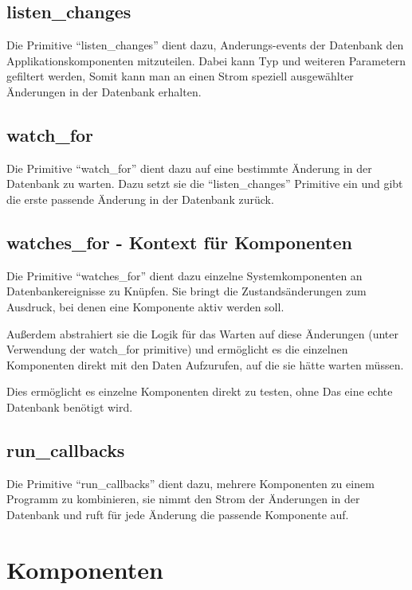 \subsection{listen\_changes}

Die Primitive ``listen\_changes'' dient dazu,
Anderungs-events der Datenbank den Applikationskomponenten mitzuteilen.
Dabei kann Typ und weiteren Parametern gefiltert werden,
Somit kann man an einen Strom speziell ausgewählter Änderungen in der Datenbank erhalten.

\subsection{watch\_for}

Die Primitive ``watch\_for'' dient dazu auf eine bestimmte Änderung in der Datenbank zu warten. Dazu setzt sie die ``listen\_changes'' Primitive ein und gibt die erste passende Änderung in der Datenbank zurück.

\subsection{watches\_for - Kontext für Komponenten}

Die Primitive ``watches\_for'' dient dazu einzelne Systemkomponenten
an Datenbankereignisse zu Knüpfen.
Sie bringt die Zustandsänderungen zum Ausdruck,
bei denen eine Komponente aktiv werden soll.

Außerdem abstrahiert sie die Logik für das Warten auf diese Änderungen
(unter Verwendung der watch\_for primitive)
und ermöglicht es die einzelnen Komponenten direkt mit den Daten Aufzurufen,
auf die sie hätte warten müssen.

Dies ermöglicht es einzelne Komponenten direkt zu testen, ohne Das eine echte Datenbank benötigt wird.



\subsection{run\_callbacks}

Die Primitive ``run\_callbacks'' dient dazu, mehrere Komponenten zu einem Programm
zu kombinieren, sie nimmt den Strom der Änderungen in der Datenbank und
ruft für jede Änderung die passende Komponente auf.


\section{Komponenten}

